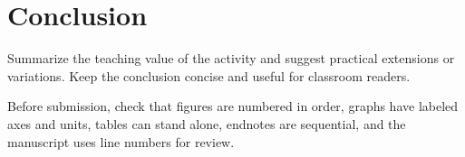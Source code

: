 \section{Conclusion}

Summarize the teaching value of the activity and suggest practical extensions or variations. Keep the conclusion concise and useful for classroom readers.

Before submission, check that figures are numbered in order, graphs have labeled axes and units, tables can stand alone, endnotes are sequential, and the manuscript uses line numbers for review.
